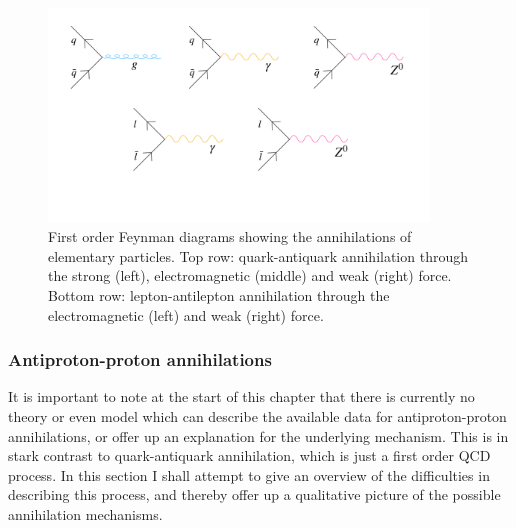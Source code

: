 \begin{figure}
    \centering
    \includegraphics[width=0.9\textwidth]{figures/Annihilation_Feynman_diagram.pdf}
    \caption{First order Feynman diagrams showing the annihilations of elementary particles. Top row: quark-antiquark annihilation through the strong (left), electromagnetic (middle) and weak (right) force. Bottom row: lepton-antilepton annihilation through the electromagnetic (left) and weak (right) force.}
    \label{fig:annihilationsFeynmanElementary}
\end{figure}

\subsubsection{Antiproton-proton annihilations}
It is important to note at the start of this chapter that there is currently no theory or even model which can describe the available data for antiproton-proton annihilations, or offer up an explanation for the underlying mechanism\cite{antiproton_cross_sections_review}. This is in stark contrast to quark-antiquark annihilation, which is just a first order QCD process. In this section I shall attempt to give an overview of the difficulties in describing this process, and thereby offer up a qualitative picture of the possible annihilation mechanisms.\\

